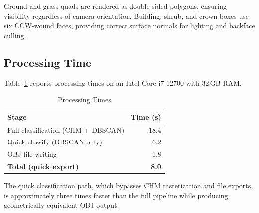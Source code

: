 Ground and grass quads are rendered as double-sided polygons, ensuring visibility regardless of camera orientation. Building, shrub, and crown boxes use six CCW-wound faces, providing correct surface normals for lighting and backface culling.

\subsection{Processing Time}

Table~\ref{tab:timing} reports processing times on an Intel Core i7-12700 with 32\,GB RAM.

\begin{table}[h]
\centering
\caption{Processing Times}
\label{tab:timing}
\begin{tabular}{lr}
\hline
\textbf{Stage} & \textbf{Time (s)} \\
\hline
Full classification (CHM + DBSCAN) & 18.4 \\
Quick classify (DBSCAN only)       & 6.2 \\
OBJ file writing                   & 1.8 \\
\hline
\textbf{Total (quick export)}      & \textbf{8.0} \\
\hline
\end{tabular}
\end{table}

The quick classification path, which bypasses CHM rasterization and file exports, is approximately three times faster than the full pipeline while producing geometrically equivalent OBJ output.
